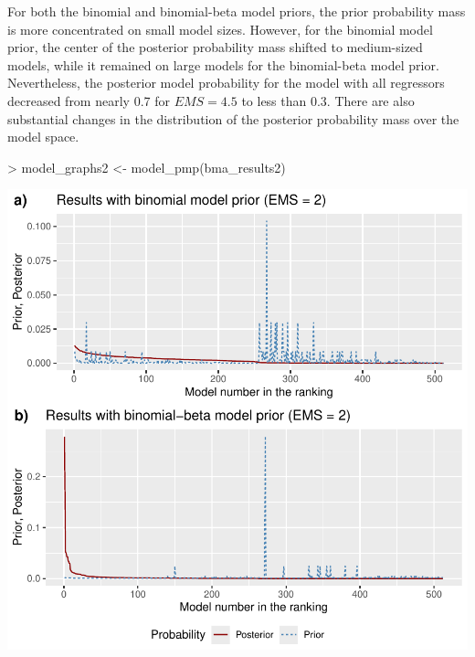\documentclass[a4paper]{article}
\begin{document}
For both the binomial and binomial-beta model priors, the prior probability mass is more concentrated on small model sizes. However, for the binomial model prior, the center of the posterior probability mass shifted to medium-sized models, while it remained on large models for the binomial-beta model prior. Nevertheless, the posterior model probability for the model with all regressors decreased from nearly 0.7 for $EMS = 4.5$ to less than 0.3. There are also substantial changes in the distribution of the posterior probability mass over the model space.
\begin{Schunk}
\begin{Sinput}
> model_graphs2 <- model_pmp(bma_results2)
\end{Sinput}
\end{Schunk}
\includegraphics{bdsm_vignette-029}
\end{document}
